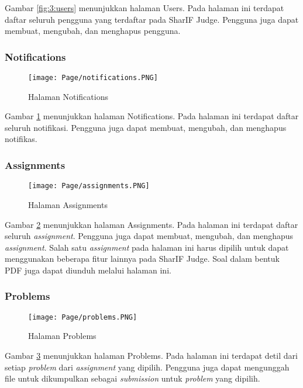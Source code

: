     Gambar \ref{fig:3:users} menunjukkan halaman Users. Pada halaman ini terdapat daftar seluruh pengguna yang terdaftar pada SharIF Judge. Pengguna juga dapat membuat, mengubah, dan menghapus pengguna.
    
\subsubsection{Notifications}
    \begin{figure}[H]
    	\centering  
    	\texttt{[image: Page/notifications.PNG]}  
    	\caption{Halaman Notifications}
    	\label{fig:3:notifications} 
    \end{figure} 
    
    Gambar \ref{fig:3:notifications} menunjukkan halaman Notifications. Pada halaman ini terdapat daftar seluruh notifikasi. Pengguna juga dapat membuat, mengubah, dan menghapus notifikas.

\subsubsection{Assignments}
    \begin{figure}[H]
    	\centering  
    	\texttt{[image: Page/assignments.PNG]}  
    	\caption{Halaman Assignments}
    	\label{fig:3:assignments} 
    \end{figure} 
    
    Gambar \ref{fig:3:assignments} menunjukkan halaman Assignments. Pada halaman ini terdapat daftar seluruh \textit{assignment}. Pengguna juga dapat membuat, mengubah, dan menghapus \textit{assignment}. Salah satu \textit{assignment} pada halaman ini harus dipilih untuk dapat menggunakan beberapa fitur lainnya pada SharIF Judge. Soal dalam bentuk PDF juga dapat diunduh melalui halaman ini. 
    
\subsubsection{Problems}
    \begin{figure}[H]
    	\centering  
    	\texttt{[image: Page/problems.PNG]}  
    	\caption{Halaman Problems}
    	\label{fig:3:problems} 
    \end{figure} 
    
    Gambar \ref{fig:3:problems} menunjukkan halaman Problems. Pada halaman ini terdapat detil dari setiap \textit{problem} dari \textit{assignment} yang dipilih. Pengguna juga dapat mengunggah file untuk dikumpulkan sebagai \textit{submission} untuk \textit{problem} yang dipilih.
    
